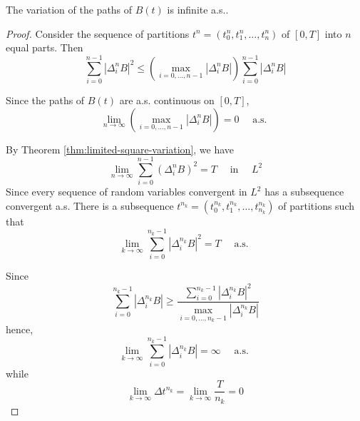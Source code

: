 \begin{theorem}
	The variation of the paths of $B(t)$ is infinite a.s..
\end{theorem}

\begin{proof}
	Consider the sequence of partitions $t^{n}=\left(t_{0}^{n},t_{1}^{n},\ldots,t_{n}^{n}\right)$ of $[0,T]$ into $n$ equal parts. Then
	\begin{equation*}
		\sum_{i=0}^{n-1}\left|\Delta_{i}^{n}B\right|^{2}\leq\left(\max_{i=0,\ldots,n-1}\left|\Delta_{i}^{n}B\right|\right)\sum_{i=0}^{n-1}\left|\Delta_{i}^{n}B\right|
	\end{equation*}

	Since the paths of $B(t)$ are a.s. continuous on $[0,T]$,
	\begin{equation*}
		\lim_{n\rightarrow\infty}\left(\max_{i=0,\ldots,n-1}\left|\Delta_{i}^{n}B\right|\right)=0\quad\text{ a.s. }
	\end{equation*}

	By Theorem \ref{thm:limited-square-variation}, we have
	\begin{equation*}
		\lim_{n\rightarrow\infty}\sum_{i=0}^{n-1}\left(\Delta_{i}^{n}B\right)^{2}=T\quad\text { in }\quad L^{2}
	\end{equation*}
	Since every sequence of random variables convergent in $L^{2}$ has a subsequence convergent a.s. There is a subsequence $t^{n_{k}}=\left(t_{0}^{n_{k}},t_{1}^{n_{k}},\ldots,t_{n_{k}}^{n_{k}}\right)$ of partitions such that
	\begin{equation*}
		\lim_{k\rightarrow\infty}\sum_{i=0}^{n_{k}-1}\left|\Delta_{i}^{n_{k}}B\right|^{2}=T\quad\text{ a.s. }
	\end{equation*}

	Since
	\begin{equation*}
		\sum_{i=0}^{n_{k}-1}\left|\Delta_{i}^{n_{k}}B\right|\geq\frac{\sum_{i=0}^{n_{k}-1}\left|\Delta_{i}^{n_{k}}B\right|^{2}}{\max_{i=0,\ldots,n_{k}-1}\left|\Delta_{i}^{n_{k}}B\right|}
	\end{equation*}
	hence,
	\begin{equation*}
		\lim_{k\rightarrow\infty}\sum_{i=0}^{n_{k}-1}\left|\Delta_{i}^{n_{k}}B\right|=\infty\quad\text{ a.s. }
	\end{equation*}
	while
	\begin{equation*}
		\lim_{k\rightarrow\infty}\Delta t^{n_{k}}=\lim_{k\rightarrow\infty}\frac{T}{n_{k}}=0
	\end{equation*}
\end{proof}

